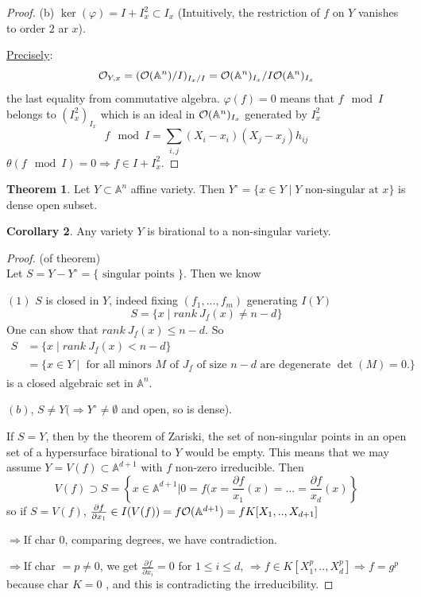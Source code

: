 \documentclass[11pt]{article}
\theoremstyle{definition}
\newtheorem{thm}{Theorem}[section]
\newtheorem{cor}[thm]{Corollary}
\newcommand{\affn}{\mathbb A}
\newcommand{\calo}{{\cal O}}
\newcommand{\pd}{\partial}
\newcommand{\Lrta}{\Longrightarrow}
\begin{document}
\begin{proof}
	(b) $\ker(\varphi)=I+I_x^2\subset I_x$ (Intuitively, the restriction of $f$ on $Y$ vanishes to order $2$ ar $x$). 
	
	\underline{Precisely}: 
	$$
	\calo_{Y,x}=(\calo(\affn^n)/I)_{I_x/I}=\calo(\affn^n)_{I_x}/I\calo(\affn^n)_{I_x}
	$$
	the last equality from commutative algebra. $\varphi(f)=0$ means that $f\mod I$ belongs to $(I_x^2)_{I_x}$ which is an ideal in $\calo(\affn^n)_{I_x}$ generated by $I_x^2$
	$$
	f\mod I=\sum_{i,j}(X_i-x_i)(X_j-x_j)h_{ij}
	$$
	$\theta(f\mod I)=0\Lrta f\in I+I_x^2$.
\end{proof}

\begin{thm}
Let $Y\subset \affn^n$ affine variety. Then $Y^\circ =\{x\in Y\mid Y\text{ non-singular at } x\}$  is dense open subset.
\end{thm}
\begin{cor}
Any variety $Y$ is birational to a non-singular variety.
\end{cor}
\begin{proof}
(of theorem)\\
Let $S=Y-Y^\circ=\{\text{ singular points }\}$. Then we know

$(1)$ $S$ is closed in $Y$, indeed fixing $(f_1,...,f_m)$ generating $I(Y)$
$$
S=\{x\mid rank\  J_{\underline{f}}(x)\neq n-d\} 
$$
One can show that $rank\ J_{\underline{f}}(x)\leq n-d$. So
$$
\begin{aligned}
S&=\{x\mid rank\  J_{\underline{f}}(x)< n-d\}\\
&=\{x\in Y\mid \text{ for all minors $M$ of $J_{\underline{f}}$ of size $n-d$ are degenerate $\det (M)=0$.}\}
\end{aligned}
$$
is a closed algebraic set in $\affn^n$.

$(b)$, $S\neq Y(\Lrta Y^\circ\neq \emptyset$ and open, so is dense). 

If $S=Y$, then by the theorem of Zariski, the set of non-singular points in an open set of a hypersurface birational to $Y$ would be empty. This means that we may assume $Y=V(f)\subset \affn^{d+1}$ with $f$ non-zero irreducible.
 Then 
 $$
V(f)\supset S=\left\{x\in \affn^{d+1}|0=f(x=\frac{\pd f}{x_1}(x)=...=\frac{\pd f}{x_d}(x)\right\}
 $$
 so if $S=V(f)$, $\frac{\pd f}{\pd x_1}\in I(V(f))=f\calo(\affn^{d+1})=f K[X_1,..,X_{d+1}]$

 $\Lrta$If char $0$, comparing degrees, we have contradiction.

 $\Lrta$If char $=p\neq 0$, we get $\frac{\pd f}{\pd x_i}=0$ for $1\leq i\leq d$,
 $\Lrta f\in K[X_1^p,..,X_d^{p}]\Lrta f=g^p$ because  $\text{char }K=0$ , and this is contradicting the irreducibility.
\end{proof}
\end{document}
